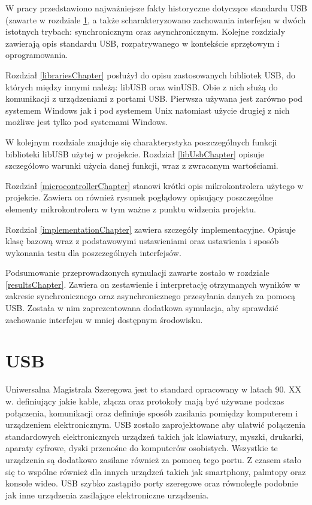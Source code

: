 \documentclass{BscUS}
\begin{document}
W pracy przedstawiono najważniejsze fakty historyczne dotyczące standardu USB (zawarte w rozdziale \ref{USBStandardChapter}, a także scharakteryzowano zachowania interfejsu w dwóch istotnych trybach: synchronicznym oraz asynchronicznym. Kolejne rozdziały zawierają opis standardu USB, rozpatrywanego w kontekście sprzętowym i oprogramowania.

Rozdział \ref{librariesChapter} posłużył do opisu zastosowanych bibliotek USB, do których między innymi należą: libUSB oraz winUSB. Obie z nich służą do komunikacji z urządzeniami z portami USB. Pierwsza używana jest zarówno pod systemem Windows jak i pod systemem Unix natomiast użycie drugiej z nich możliwe jest tylko pod systemami Windows.

W kolejnym rozdziale znajduje się charakterystyka poszczególnych funkcji biblioteki libUSB użytej w projekcie. Rozdział \ref{libUsbChapter} opisuje szczegółowo warunki użycia danej funkcji, wraz z zwracanym wartościami. 

Rozdział \ref{microcontrollerChapter} stanowi krótki opis mikrokontrolera użytego w projekcie. Zawiera on również rysunek poglądowy opisujący poszczególne elementy mikrokontrolera w tym ważne z punktu widzenia projektu.

Rozdział \ref{implementationChapter} zawiera szczegóły implementacyjne. Opisuje klasę bazową wraz z podstawowymi ustawieniami oraz ustawienia i sposób wykonania testu dla poszczególnych interfejsów.

Podsumowanie przeprowadzonych symulacji zawarte zostało w rozdziale \ref{resultsChapter}. Zawiera on zestawienie i interpretację otrzymanych wyników w zakresie synchronicznego oraz asynchronicznego przesyłania danych za pomocą USB. Została w nim zaprezentowana dodatkowa symulacja, aby sprawdzić zachowanie interfejsu w mniej dostępnym środowisku.

\chapter{USB}
\label{USBStandardChapter}
Uniwersalna Magistrala Szeregowa jest to standard opracowany w latach 90. XX w. definiujący jakie kable, złącza oraz protokoły mają być używane podczas połączenia, komunikacji oraz definiuje sposób zasilania pomiędzy komputerem i urządzeniem elektronicznym. USB zostało zaprojektowane aby ułatwić połączenia standardowych elektronicznych urządzeń takich jak klawiatury, myszki, drukarki, aparaty cyfrowe, dyski przenośne do komputerów osobistych. Wszystkie te urządzenia są dodatkowo zasilane również za pomocą tego portu. Z czasem stało się to wspólne również dla innych urządzeń takich jak smartphony, palmtopy oraz konsole wideo.\cite{USBSystemArch, USB20Doc, USB30Doc}
\newline
USB szybko zastąpiło porty szeregowe oraz równoległe podobnie jak inne urządzenia zasilające elektroniczne urządzenia.
\end{document}

